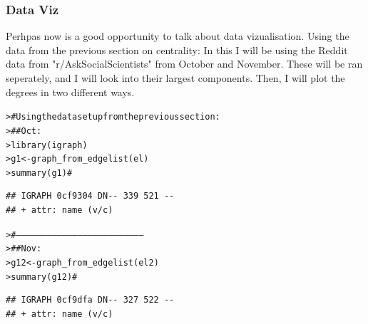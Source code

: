 \documentclass[12pt]{article}\usepackage[]{graphicx}\usepackage[]{color}
\makeatletter
\newcommand{\hlcom}[1]{\textcolor[rgb]{0.404,0.408,0.42}{#1}}%
\newcommand{\hlstd}[1]{\textcolor[rgb]{0.882,0.878,0.898}{#1}}%
\newcommand{\hlkwb}[1]{\textcolor[rgb]{0.902,0.675,0.196}{#1}}%
\newcommand{\hlkwd}[1]{\textcolor[rgb]{0.733,0.388,0.812}{#1}}%
\newenvironment{kframe}{%
 \def\at@end@of@kframe{}%
 \ifinner\ifhmode%
  \def\at@end@of@kframe{\end{minipage}}%
  \begin{minipage}{\columnwidth}%
 \fi\fi%
 \def\FrameCommand##1{\hskip\@totalleftmargin \hskip-\fboxsep
 \colorbox{shadecolor}{##1}\hskip-\fboxsep
     \hskip-\linewidth \hskip-\@totalleftmargin \hskip\columnwidth}%
 \MakeFramed {\advance\hsize-\width
   \@totalleftmargin\z@ \linewidth\hsize
   \@setminipage}}%
 {\par\unskip\endMakeFramed%
 \at@end@of@kframe}
\newenvironment{knitrout}{}{} %
\makeatother
\begin{document}
\begin{flushleft}
\subsubsection{Data Viz}

Perhpas now is a good opportunity to talk about data vizualisation. Using the data from the previous section on centrality:
In this I will be using the Reddit data from "r/AskSocialScientists" from October and November. These will be ran seperately, and I will look into their largest components. Then, I will plot the degrees in two different ways.

\begin{knitrout}
\color{fgcolor}\begin{kframe}
\begin{alltt}
\hlstd{> }\hlcom{# Using the data set up from the previous section:}
\hlstd{> }\hlcom{##    Oct:}
\hlstd{> }\hlkwd{library}\hlstd{(igraph)}
\hlstd{> }\hlstd{g1} \hlkwb{<-} \hlkwd{graph_from_edgelist}\hlstd{(el)}
\hlstd{> }\hlkwd{summary}\hlstd{(g1)} \hlcom{#}
\end{alltt}
\begin{verbatim}
## IGRAPH 0cf9304 DN-- 339 521 -- 
## + attr: name (v/c)
\end{verbatim}
\begin{alltt}
\hlstd{> }\hlcom{#---------------------------------------------------------------------------}
\hlstd{> }\hlcom{##   Nov:}
\hlstd{> }\hlstd{g12} \hlkwb{<-} \hlkwd{graph_from_edgelist}\hlstd{(el2)}
\hlstd{> }\hlkwd{summary}\hlstd{(g12)} \hlcom{#}
\end{alltt}
\begin{verbatim}
## IGRAPH 0cf9dfa DN-- 327 522 -- 
## + attr: name (v/c)
\end{verbatim}
\end{kframe}
\end{knitrout}


\end{flushleft}
\end{document}
